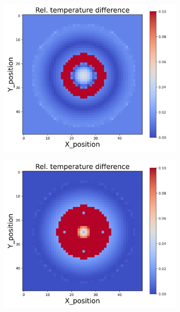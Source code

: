 \begin{figure}[h]
\begin{minipage}{\textwidth}
\begin{subfigure}{0.3\textwidth}
        \end{subfigure}
        \begin{subfigure}{0.3\textwidth}
            \centering
            \includegraphics[width=\textwidth]{figures/raw_data/23/quad/T_bias.jpg}
        \end{subfigure}
        \begin{subfigure}{0.3\textwidth}
            \centering
            \includegraphics[width=\textwidth]{figures/raw_data/24/quad/T_bias.jpg}

\end{subfigure}
\end{minipage}
\end{figure}
